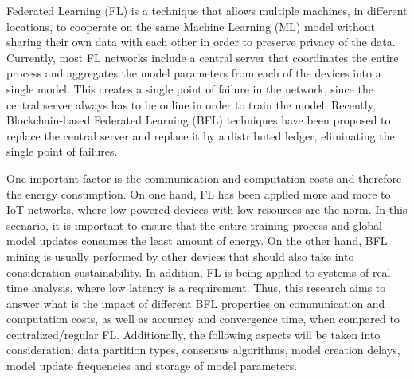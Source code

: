 
Federated Learning (FL) is a technique that allows multiple machines, in different locations, to cooperate on the same Machine Learning (ML) model without sharing their own data with each other in order to preserve privacy of the data. Currently, most FL networks include a central server that coordinates the entire process and aggregates the model parameters from each of the devices into a single model. This creates a single point of failure in the network, since the central server always has to be online in order to train the model. Recently, Blockchain-based Federated Learning (BFL) techniques have been proposed to replace the central server and replace it by a distributed ledger, eliminating the single point of failures. 

One important factor is the communication and computation costs and therefore the energy consumption. On one hand, FL has been applied more and more to IoT networks, where low powered devices with low resources are the norm. In this scenario, it is important to ensure that the entire training process and global model updates consumes the least amount of energy. On the other hand, BFL mining is usually performed by other devices that should also take into consideration sustainability. In addition, FL is being applied to systems of real-time analysis, where low latency is a requirement. Thus, this research aims to answer what is the impact of different BFL properties on communication and computation costs, as well as accuracy and convergence time, when compared to centralized/regular FL. Additionally, the following aspects will be taken into consideration: data partition types, consensus algorithms, model creation delays, model update frequencies and storage of model parameters.
